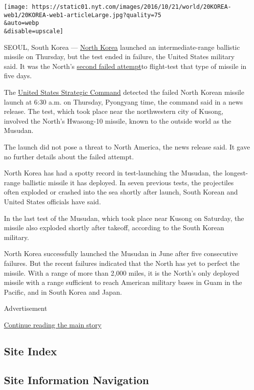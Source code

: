 \texttt{[image: https://static01.nyt.com/images/2016/10/21/world/20KOREA-web1/20KOREA-web1-articleLarge.jpg?quality=75\\\&auto=webp\\\&disable=upscale]}

SEOUL, South Korea ---
\href{http://www.nytimes.com/topic/destination/north-korea?8qa}{North
Korea} launched an intermediate-range ballistic missile on Thursday, but
the test ended in failure, the United States military said. It was the
North's
\href{http://www.nytimes.com/2016/10/16/world/asia/north-korean-missile-test.html}{second
failed attempt}to flight-test that type of missile in five days.

The \href{https://www.stratcom.mil/}{United States Strategic Command}
detected the failed North Korean missile launch at 6:30 a.m. on
Thursday, Pyongyang time, the command said in a news release. The test,
which took place near the northwestern city of Kusong, involved the
North's Hwasong-10 missile, known to the outside world as the Musudan.

The launch did not pose a threat to North America, the news release
said. It gave no further details about the failed attempt.

North Korea has had a spotty record in test-launching the Musudan, the
longest-range ballistic missile it has deployed. In seven previous
tests, the projectiles often exploded or crashed into the sea shortly
after launch, South Korean and United States officials have said.

In the last test of the Musudan, which took place near Kusong on
Saturday, the missile also exploded shortly after takeoff, according to
the South Korean military.

North Korea successfully launched the Musudan in June after five
consecutive failures. But the recent failures indicated that the North
has yet to perfect the missile. With a range of more than 2,000 miles,
it is the North's only deployed missile with a range sufficient to reach
American military bases in Guam in the Pacific, and in South Korea and
Japan.

Advertisement

\protect\hyperlink{after-bottom}{Continue reading the main story}

\hypertarget{site-index}{%
\subsection{Site Index}\label{site-index}}

\hypertarget{site-information-navigation}{%
\subsection{Site Information
Navigation}\label{site-information-navigation}}

